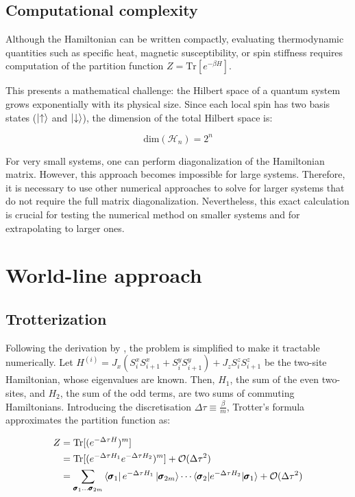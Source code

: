 \documentclass[a4paper]{article}
\begin{document}
\subsection{Computational complexity}

Although the Hamiltonian can be written compactly, evaluating thermodynamic quantities such as specific heat, magnetic susceptibility, or spin stiffness requires computation of the partition function $Z = \mathrm{Tr}[e^{-\beta H}]$.

This presents a mathematical challenge: the Hilbert space of a quantum system grows exponentially with its physical size. Since each local spin has two basis states ($\ket{\uparrow}$ and $\ket{\downarrow}$), the dimension of the total Hilbert space is:

\begin{equation}
    \text{dim}(\mathcal{H}_n) = 2^n
\end{equation}

For very small systems, one can perform diagonalization of the Hamiltonian matrix. However, this approach becomes impossible for large systems. Therefore, it is necessary to use other numerical approaches to solve for larger systems that do not require the full matrix diagonalization. Nevertheless, this exact calculation is crucial for testing the numerical method on smaller systems and for extrapolating to larger ones.


\section{World-line approach}

\subsection{Trotterization}

Following the derivation by \textcite{Assaad2008}, the problem is simplified to make it tractable numerically. Let $H^{(i)} = J_{x}(S_{i}^{x}S_{i+1}^{x} + S_{i}^{y}S_{i+1}^{y}) + J_{z}S_{i}^{z}S_{i+1}^{z}$ be the two-site Hamiltonian, whose eigenvalues are known. Then, $H_1$, the sum of the even two-sites, and $H_2$, the sum of the odd terms, are two sums of commuting Hamiltonians. Introducing the discretisation $\Delta\tau \equiv \frac{\beta}{m}$, Trotter’s formula approximates the partition function as:

\begin{align*}
    Z &= \text{Tr}[(e^{-\Delta\tau H})^{m}] \\
        &= \text{Tr}[(e^{-\Delta\tau  H_{1}}e^{-\Delta\tau  H_{2}})^{m}] + \mathcal{O}(\Delta\tau^{2}) \\
        &=\sum_{\pmb{\sigma}_1 \dots \pmb{\sigma}_{2m}} \bra{\pmb{\sigma}_1} e^{-\Delta\tau H_1} \ket{\pmb{\sigma}_{2m}} \cdots \braket{\pmb{\sigma}_2|e^{-\Delta\tau H_2}|\pmb{\sigma}_1} + \mathcal{O}(\Delta\tau^{2})
\end{align*}
\end{document}
